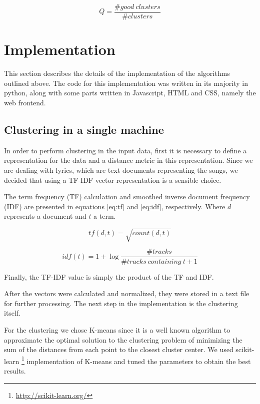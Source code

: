 \documentclass[10pt,a4paper]{scrartcl}
\begin{document}
      \begin{equation}
        \label{eq:majority_metric}
        Q = \frac{\#good\ clusters}{\#clusters}
      \end{equation}
      
  \section{Implementation}
    This section describes the details of the implementation of the algorithms
    outlined above. The code for this implementation was written in its majority
    in python, along with some parts written in Javascript, HTML and CSS,
    namely the web frontend.

    \subsection{Clustering in a single machine}
      In order to perform clustering in the input data, first it is necessary to
      define a representation for the data and a distance metric in this
      representation. Since we are dealing with lyrics, which are text documents
      representing the songs, we decided that using a TF-IDF vector
      representation is a sensible choice.
      
      The term frequency (TF) calculation and smoothed inverse document frequency
      (IDF) are presented in equations \ref{eq:tf} and \ref{eq:idf},
      respectively. Where $d$ represents a document and $t$ a term.
      
      \begin{equation}
        \label{eq:tf}
        tf(d, t) = \sqrt{count(d, t)}
      \end{equation}
     
      \begin{equation}
        \label{eq:idf}
        idf(t) = 1 + \log{\frac{\#tracks}{\#tracks\ containing\ t + 1}}
      \end{equation}
      
      Finally, the TF-IDF value is simply the product of the TF and IDF.
      
      After the vectors were calculated and normalized, they were stored in
      a text file for further processing. The next step in the implementation
      is the clustering itself.
      
      For the clustering we chose K-means since it is a well known algorithm
      to approximate the optimal solution to the clustering problem
      of minimizing the sum of the distances from each point to the closest
      cluster center. We used scikit-learn
      \footnote{\url{http://scikit-learn.org/}} implementation of K-means and
      tuned the parameters to obtain the best results.
\end{document}
